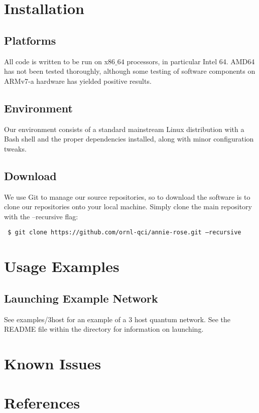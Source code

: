 \documentclass[letterpaper,twoside=false]{scrbook}
\newcommand{\code}[1]{\texttt{#1}}
\begin{document}
\chapter{Installation}
	\section{Platforms}
	
	All code is written to be run on x$86\_64$ processors, in particular Intel 64. AMD64 has not been tested thoroughly, although some testing of software components on ARMv7-a hardware has yielded positive results.
	
	\section{Environment}

		Our environment consists of a standard mainstream Linux distribution with a Bash shell and the proper dependencies installed, along with minor configuration tweaks.

	\section{Download}
 		
 		We use Git to manage our source repositories, so to download the software is to clone our repositories onto your local machine. Simply clone the main repository with the --recursive flag:
 		
 		\code{
 		\$ git clone https://github.com/ornl-qci/annie-rose.git --recursive
 		}
 
\chapter{Usage Examples}
 	\section{Launching Example Network}
 		See examples/3host for an example of a 3 host quantum network. See the README file within the directory for information on launching.
 	
\chapter{Known Issues}
\chapter{References}
\end{document}
